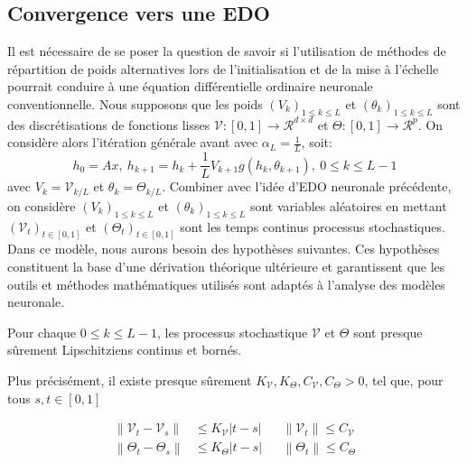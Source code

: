 \subsection{Convergence vers une EDO}
Il est nécessaire de se poser la question de savoir si l'utilisation de méthodes de répartition de poids alternatives lors de l'initialisation et de la mise à l'échelle pourrait conduire à une équation différentielle ordinaire neuronale conventionnelle. Nous supposons que les poids $(V_k)_{1\leqslant k \leqslant L }$ et $(\theta_k)_{1\leqslant k \leqslant L }$ sont des discrétisations de fonctions lisses $\mathcal{V}:[0,1] \to \mathcal{R}^{d \times d}$ et $\Theta:[0,1] \to \mathcal{R}^{p}$. On considère alors l'itération générale avant avec $\alpha_L = \frac{1}{L}$, soit:
\begin{equation}\label{eq13}
    h_0 = Ax,\ h_{k+1} = h_k + \frac{1}{L}V_{k+1}g(h_k,\theta_{k+1}),\ 0 \leqslant k \leqslant L-1
\end{equation}
avec $V_k = \mathcal{V}_{k/L}$ et $\theta_k = \Theta_{k/L}$.
Combiner avec l'idée d'EDO neuronale précédente, on considère $(V_k)_{1\leqslant k \leqslant L }$ et $(\theta_k)_{1\leqslant k \leqslant L }$ sont variables aléatoires en mettant $(\mathcal{V}_t)_{t \in [0,1]}$ et $(\Theta_t)_{t \in [0,1]}$ sont les temps continus processus stochastiques. Dans ce modèle, nous aurons besoin des hypothèses suivantes. Ces hypothèses constituent la base d'une dérivation théorique ultérieure et garantissent que les outils et méthodes mathématiques utilisés sont adaptés à l'analyse des modèles neuronale. 

\begin{assumption}\label{H5}
    Pour chaque $0 \leqslant k \leqslant L-1$, les processus stochastique $\mathcal{V}$ et $\Theta$ sont presque sûrement Lipschitziens continus et bornés.
\end{assumption}

Plus précisément, il existe presque sûrement $K_{\mathscr{V}}, K_{\Theta}, C_{\mathscr{V}}, C_{\Theta}>0$, tel que, pour tous $s, t \in [0,1]$

\begin{align*}
    \left\|\mathscr{V}_t-\mathscr{V}_s\right\| &\leqslant K_{\mathscr{V}}|t-s| 
    &&\left\|\mathscr{V}_t\right\| \leqslant C_{\mathscr{V}} \\
    \left\|\Theta_t-\Theta_s\right\| &\leqslant K_{\Theta}|t-s| 
    &&\left\|\Theta_t\right\| \leqslant C_{\Theta}
\end{align*}

